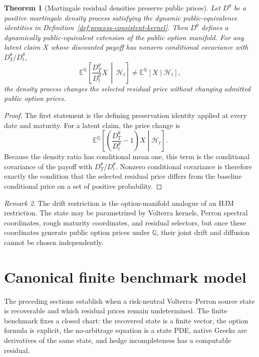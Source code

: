 \documentclass[11pt,a4paper]{amsart}
\theoremstyle{plain}
\newtheorem{theorem}{Theorem}[section]
\theoremstyle{definition}
\theoremstyle{remark}
\newtheorem{remark}[theorem]{Remark}
\newcommand{\QQ}{\mathbb{Q}}
\newcommand{\EE}{\mathbb{E}}
\newcommand{\cH}{\mathcal{H}}
\begin{document}
\begin{theorem}[Martingale residual densities preserve public prices]
\label{thm:martingale-residual-density}
Let \(D^\theta\) be a positive martingale density process satisfying the dynamic
public-equivalence identities in Definition~\ref{def:process-consistent-kernel}.  Then
\(D^\theta\) defines a dynamically public-equivalent extension of the public option manifold.
For any latent claim \(X\) whose discounted payoff has nonzero conditional covariance with
\(D_T^\theta/D_t^\theta\),
\[
        \EE^\QQ\!\left[
        \frac{D_T^\theta}{D_t^\theta}X
        \,\middle|\,\cH_t
        \right]
        \ne
        \EE^\QQ[X\mid\cH_t],
\]
the density process changes the selected residual price without changing admitted public option
prices.
\end{theorem}

\begin{proof}
The first statement is the defining preservation identity applied at every date and maturity.
For a latent claim, the price change is
\[
        \EE^\QQ\!\left[
        \left(\frac{D_T^\theta}{D_t^\theta}-1\right)X
        \middle|\cH_t
        \right].
\]
Because the density ratio has conditional mean one, this term is the conditional covariance of the
payoff with \(D_T^\theta/D_t^\theta\).  Nonzero conditional covariance is therefore exactly the
condition that the selected residual price differs from the baseline conditional price on a set of
positive probability.
\end{proof}

\begin{remark}
The drift restriction is the option-manifold analogue of an HJM restriction.  The state may be
parametrized by Volterra kernels, Perron spectral coordinates, rough maturity coordinates, and
residual selectors, but once these coordinates generate public option prices under \(\QQ\), their
joint drift and diffusion cannot be chosen independently.
\end{remark}

\section{Canonical finite benchmark model}\label{sec:finite-benchmark}

The preceding sections establish when a risk-neutral Volterra--Perron source state is recoverable
and which residual prices remain undetermined.  The finite benchmark fixes a closed chart: the
recovered state is a finite vector, the option formula is explicit, the no-arbitrage equation is a
state PDE, native Greeks are derivatives of the same state, and hedge incompleteness has a
computable residual.
\end{document}
